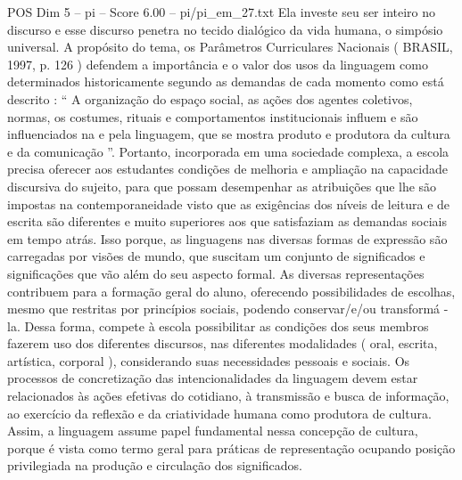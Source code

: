 \begin{textsample}{POS Dim 5 – pi – Score 6.00 – pi/pi\_em\_27.txt}
Ela investe seu ser inteiro no discurso e esse discurso penetra no tecido dialógico da vida humana, o simpósio universal.
A propósito do tema, os Parâmetros Curriculares Nacionais ( BRASIL, 1997, p. 126 ) defendem a importância e o valor dos usos da linguagem como determinados historicamente segundo as demandas de cada momento como está descrito : “ A organização do espaço social, as ações dos agentes coletivos, normas, os costumes, rituais e comportamentos institucionais influem e são influenciados na e pela linguagem, que se mostra produto e produtora da cultura e da comunicação ”.
Portanto, incorporada em uma sociedade complexa, a escola precisa oferecer aos estudantes condições de melhoria e ampliação na capacidade discursiva do sujeito, para que possam desempenhar as atribuições que lhe são impostas na contemporaneidade visto que as exigências dos níveis de leitura e de escrita são diferentes e muito superiores aos que satisfaziam as demandas sociais em tempo atrás.
Isso porque, as linguagens nas diversas formas de expressão são carregadas por visões de mundo, que suscitam um conjunto de significados e significações que vão além do seu aspecto formal.
As diversas representações contribuem para a formação geral do aluno, oferecendo possibilidades de escolhas, mesmo que restritas por princípios sociais, podendo conservar/e/ou transformá -la.
Dessa forma, compete à escola possibilitar as condições dos seus membros fazerem uso dos diferentes discursos, nas diferentes modalidades ( oral, escrita, artística, corporal ), considerando suas necessidades pessoais e sociais.
Os processos de concretização das intencionalidades da linguagem devem estar relacionados às ações efetivas do cotidiano, à transmissão e busca de informação, ao exercício da reflexão e da criatividade humana como produtora de cultura.
Assim, a linguagem assume papel fundamental nessa concepção de cultura, porque é vista como termo geral para práticas de representação ocupando posição privilegiada na produção e circulação dos significados.

\end{textsample}
